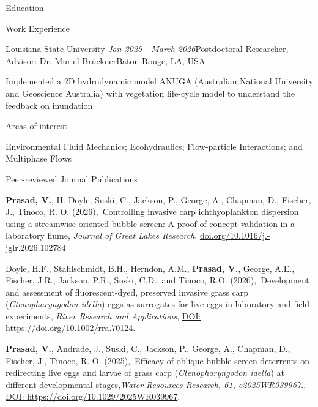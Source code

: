 \documentclass{resume} %
\begin{document}
\begin{rSection}{Education}
\begin{rSection}{Work Experience}
\begin{rSubsection}{Louisiana State University} {\em Jan 2025 - March 2026}{Postdoctoral Researcher, Advisor: Dr. Muriel Br\"uckner}{Baton Rouge, LA, USA}
\item Implemented a 2D hydrodynamic model ANUGA (Australian National University and Geoscience Australia) with vegetation life-cycle model to understand the feedback on inundation
\end{rSubsection}
\end{rSection}

\begin{rSection}{Areas of interest}
\item {Environmental Fluid Mechanics; Ecohydraulics; Flow-particle Interactions; and Multiphase Flows} 
\end{rSection}

\begin{rSection}{Peer-reviewed Journal Publications} \itemsep -2pt

\item \textbf{Prasad, V.}, H. Doyle, Suski, C., Jackson, P., George, A., Chapman, D., Fischer, J., Tinoco, R. O. (2026),\ {Controlling invasive carp ichthyoplankton dispersion using a streamwise-oriented bubble screen: A proof-of-concept validation in a laboratory flume}, \textit{Journal of Great Lakes Research}. \href{https://doi.org/10.1016/j.jglr.2026.102784}{doi.org/10.1016/j.-jglr.2026.102784} \\

\item Doyle, H.F., Stahlschmidt, B.H., Herndon, A.M., \textbf{Prasad, V.}, George, A.E., Fischer, J.R., Jackson, P.R., Suski, C.D., and Tinoco, R.O. (2026),\ {Development and assessment of fluorescent-dyed, preserved invasive grass carp (\textit{Ctenopharyngodon idella}) eggs as surrogates for live eggs in laboratory and field experiments}, \textit{River Research and Applications}, \href{https://doi.org/10.1002/rra.70124}{DOI: https://doi.org/10.1002/rra.70124}.\\

\item \textbf{Prasad, V.}, Andrade, J., Suski, C., Jackson, P., George, A., Chapman, D., Fischer, J., Tinoco, R. O. (2025),\ {Efficacy of oblique bubble screen deterrents on redirecting live eggs and larvae of grass carp (\textit{Ctenopharyngodon idella}) at different developmental stages},\textit{Water Resources Research, 61, e2025WR039967.}, \href{https://doi.org/10.1029/2025WR039967}{DOI: https://doi.org/10.1029/2025WR039967}. \\


\end{rSection}
\end{rSection}
\end{document}
